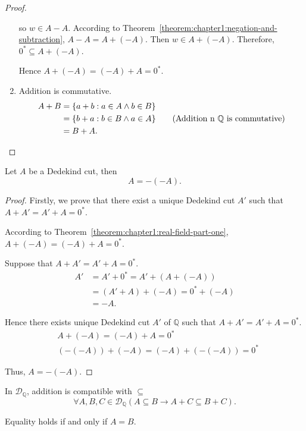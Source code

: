 \begin{proof}
\begin{enumerate}[label = (F\arabic*)]
              so $w\in A - A$. According to Theorem~\ref{theorem:chapter1:negation-and-subtraction}, $A - A = A + (-A)$. Then $w\in A + (-A)$. Therefore, ${0}^{*}\subseteq A + (-A)$.
              \bigskip

              Hence $A + (-A) = (-A) + A = {0}^{*}$.
        \item Addition is commutative.
              \begin{align*}
                  A + B & = \{ a + b : a\in A\land b\in B \}                                                      \\
                        & = \{ b + a : b\in B\land a\in A \}\qquad\text{(Addition n $\mathbb{Q}$ is commutative)} \\
                        & = B + A.\qedhere
              \end{align*}
    \end{enumerate}
\end{proof}

\begin{theorem}\label{theorem:chapter1:negation-is-an-involution}
    Let $A$ be a Dedekind cut, then
    \[
        A = -(-A).
    \]
\end{theorem}

\begin{proof}
    Firstly, we prove that there exist a unique Dedekind cut $A'$ such that $A + A' = A' + A = {0}^{*}$.

    According to Theorem~\ref{theorem:chapter1:real-field-part-one}, $A + (-A) = (-A) + A = {0}^{*}$.

    Suppose that $A + A' = A' + A = {0}^{*}$.
    \begin{align*}
        A' & = A' + {0}^{*} = A' + (A + (-A))   \\
           & = (A' + A) + (-A) = {0}^{*} + (-A) \\
           & = -A.
    \end{align*}

    Hence there exists unique Dedekind cut $A'$ of $\mathbb{Q}$ such that $A + A' = A' + A = {0}^{*}$.
    \begin{align*}
         & A + (-A) = (-A) + A = {0}^{*}             \\
         & (-(-A)) + (-A) = (-A) + (-(-A)) = {0}^{*}
    \end{align*}

    Thus, $A = -(-A)$.
\end{proof}

\begin{theorem}
    In $\mathscr{D}_{\mathbb{Q}}$, addition is compatible with $\subseteq$
    \[
        \forall A, B, C\in\mathscr{D}_{\mathbb{Q}}(A\subseteq B \rightarrow A + C\subseteq B + C).
    \]

    Equality holds if and only if $A = B$.
\end{theorem}

